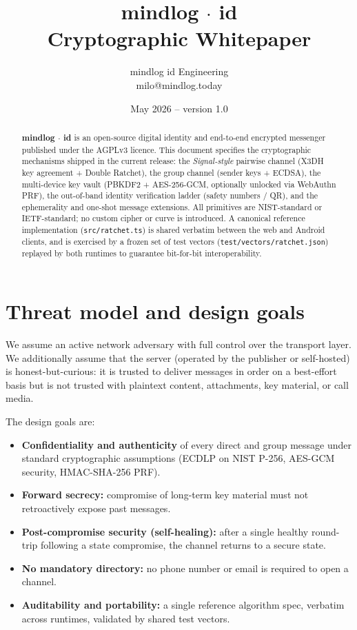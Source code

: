 \documentclass[11pt,a4paper]{article}
\title{\textbf{mindlog $\cdot$ id} \\[2pt]
  \large Cryptographic Whitepaper}
\author{mindlog id Engineering \\ \small milo@mindlog.today}
\date{May 2026 -- version 1.0}
\newcommand{\code}[1]{\texttt{\small #1}}
\begin{document}
\maketitle

\begin{abstract}
\noindent
\textbf{mindlog $\cdot$ id} is an open-source digital identity and end-to-end
encrypted messenger published under the AGPLv3 licence. This document specifies
the cryptographic mechanisms shipped in the current release: the
\emph{Signal-style} pairwise channel (X3DH key agreement + Double Ratchet),
the group channel (sender keys + ECDSA), the multi-device key vault
(PBKDF2 + AES-256-GCM, optionally unlocked via WebAuthn PRF), the
out-of-band identity verification ladder (safety numbers / QR), and the
ephemerality and one-shot message extensions. All primitives are NIST-standard
or IETF-standard; no custom cipher or curve is introduced. A canonical
reference implementation (\code{src/ratchet.ts}) is shared verbatim between
the web and Android clients, and is exercised by a frozen set of test
vectors (\code{test/vectors/ratchet.json}) replayed by both runtimes to
guarantee bit-for-bit interoperability.
\end{abstract}

\section{Threat model and design goals}

We assume an active network adversary with full control over the transport
layer. We additionally assume that the server (operated by the publisher or
self-hosted) is honest-but-curious: it is trusted to deliver messages in
order on a best-effort basis but is not trusted with plaintext content,
attachments, key material, or call media.

The design goals are:
\begin{itemize}
  \item \textbf{Confidentiality and authenticity} of every direct and group
    message under standard cryptographic assumptions
    (ECDLP on NIST P-256, AES-GCM security, HMAC-SHA-256 PRF).
  \item \textbf{Forward secrecy:} compromise of long-term key material must
    not retroactively expose past messages.
  \item \textbf{Post-compromise security (self-healing):} after a single
    healthy round-trip following a state compromise, the channel returns
    to a secure state.
  \item \textbf{No mandatory directory:} no phone number or email is
    required to open a channel.
  \item \textbf{Auditability and portability:} a single reference algorithm
    spec, verbatim across runtimes, validated by shared test vectors.
\end{itemize}
\end{document}
